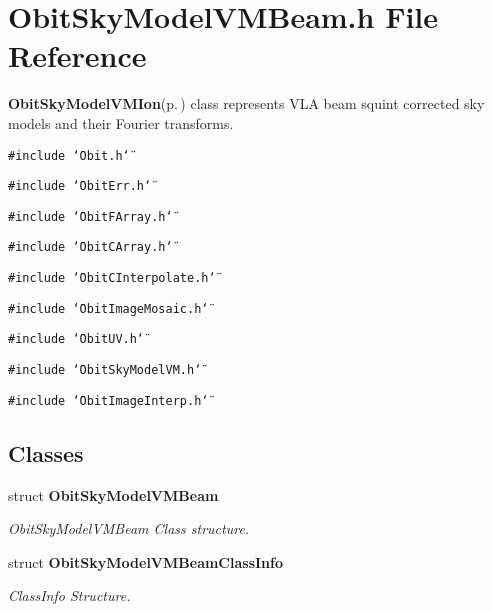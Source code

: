 \section{Obit\-Sky\-Model\-VMBeam.h File Reference}
\label{ObitSkyModelVMBeam_8h}
{\bf Obit\-Sky\-Model\-VMIon}{\rm (p.\,\pageref{structObitSkyModelVMIon})} class represents VLA beam squint corrected sky models and their Fourier transforms. 

{\tt \#include \char`\"{}Obit.h\char`\"{}}\par
{\tt \#include \char`\"{}Obit\-Err.h\char`\"{}}\par
{\tt \#include \char`\"{}Obit\-FArray.h\char`\"{}}\par
{\tt \#include \char`\"{}Obit\-CArray.h\char`\"{}}\par
{\tt \#include \char`\"{}Obit\-CInterpolate.h\char`\"{}}\par
{\tt \#include \char`\"{}Obit\-Image\-Mosaic.h\char`\"{}}\par
{\tt \#include \char`\"{}Obit\-UV.h\char`\"{}}\par
{\tt \#include \char`\"{}Obit\-Sky\-Model\-VM.h\char`\"{}}\par
{\tt \#include \char`\"{}Obit\-Image\-Interp.h\char`\"{}}\par
\subsection*{Classes}
\begin{CompactItemize}
\item 
struct {\bf Obit\-Sky\-Model\-VMBeam}
\begin{CompactList}\small\item\em Obit\-Sky\-Model\-VMBeam Class structure. \item\end{CompactList}\item 
struct {\bf Obit\-Sky\-Model\-VMBeam\-Class\-Info}
\begin{CompactList}\small\item\em Class\-Info Structure. \item\end{CompactList}\end{CompactItemize}

